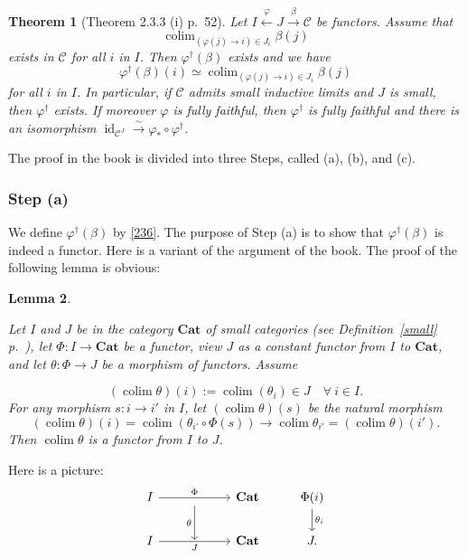 \documentclass[12pt]{article}%
\newtheorem{thm}{Theorem}%
\newtheorem{lem}[thm]{Lemma}
\theoremstyle{remark}
\theoremstyle{definition}
\newcommand{\C}{\mathcal C}
\newcommand{\Cat}{\mathbf{Cat}}%
\newcommand{\xr}{\xrightarrow}
\DeclareMathOperator*{\colim}{colim}
\DeclareMathOperator{\id}{id}
\begin{document}
\begin{thm}[Theorem 2.3.3 (i) p.~52]\label{233i}
Let $I\xleftarrow\varphi J\xr\beta\C$ be functors. Assume that 
$$
\colim_{(\varphi(j)\to i)\in J_i}\beta(j)
$$ 
exists in $\C$ for all $i$ in $I$. Then $\varphi^\dagger(\beta)$ exists and we have 
%
\begin{equation}\label{236}
\varphi^\dagger(\beta)(i)\simeq\colim_{(\varphi(j)\to i)\in J_i}\beta(j)
\end{equation} 
%
for all $i$ in $I$. In particular, if $\C$ admits small inductive limits and $J$ is small, then 
$\varphi^\dagger$ exists. If moreover $\varphi$ is fully faithful, then $\varphi^\dagger$ is fully faithful and there is an isomorphism $\id_{\C^J}\xr\sim\varphi_*\circ\varphi^\dagger$. 
\end{thm}
The proof in the book is divided into three Steps, called (a), (b), and (c). 

%

\subsubsection{Step (a)}\label{scji}

We define $\varphi^\dagger(\beta)$ by \eqref{236}. The purpose of Step (a) is to show that $\varphi^\dagger(\beta)$ is indeed a functor. Here is a variant of the argument of the book. The proof of the following lemma is obvious: 

\begin{lem}\label{r52}

Let $I$ and $J$ be in the category $\Cat$ of small categories (see Definition~\ref{small} p.~\pageref{small}), let $\Phi:I\to\Cat$ be a functor, view $J$ as a constant functor from $I$ to $\Cat$, and let $\theta:\Phi\to J$ be a morphism of functors. Assume 

\begin{equation}\label{52} 
(\colim\theta)(i):=\colim(\theta_i)\in J\quad\forall\ i\in I. 
\end{equation} 
%
For any morphism $s:i\to i'$ in $I$, let $(\colim\theta)(s)$ be the natural morphism 
$$
(\colim\theta)(i)=\colim(\theta_{i'}\circ\Phi(s))\to
\colim\theta_{i'}=(\colim\theta)(i'). 
$$ 
Then $\colim\theta$ is a functor from $I$ to $J$. 
%
\end{lem}
%
Here is a picture:
$$
\begin{tikzcd}
I\ar{rr}{\Phi}&\ar{d}[swap]{\theta}&\Cat&\Phi(i)\ar{d}{\theta_i}\\ 
I\ar{rr}[swap]{J}&{}&\Cat&J.
\end{tikzcd}
$$
\end{document}
